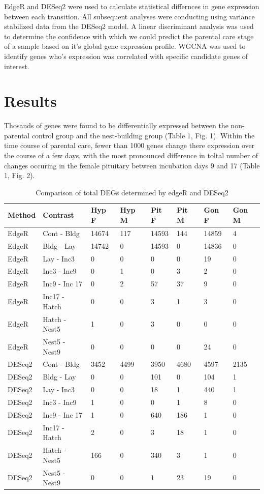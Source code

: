 \documentclass[10pt,letterpaper]{article}
\begin{document}
EdgeR and DESeq2 were used to calculate statistical differnces in gene
expression between each transition. All subsequent analyses were
conducting using variance stabilized data from the DESeq2 model. A
linear discriminant analysis was used to determine the confidence with
which we could predict the parental care stage of a sample based on it's
global gene expression profile. WGCNA was used to identify genes who's
expression was correlated with specific candidate genes of interest.

\hypertarget{results}{%
\section{Results}\label{results}}

Thosands of genes were found to be differentially expressed between the
non-parental control group and the nest-building group (Table 1, Fig.
1). Within the time course of parental care, fewer than 1000 genes
change there expression over the course of a few days, with the most
pronounced difference in toltal number of changes occuring in the female
pituitary between incubation days 9 and 17 (Table 1, Fig. 2).

\begin{table}[hb]
\begin{tabular}{llllllll}
\hline
\textbf{Method} & \textbf{Contrast} & \textbf{Hyp F} & \textbf{Hyp M} & \textbf{Pit F} & \textbf{Pit M} & \textbf{Gon F} & \textbf{Gon M} \\  \hline
EdgeR & Cont - Bldg & 14674 & 117 & 14593 & 144 & 14859 & 4 \\
EdgeR & Bldg - Lay & 14742 & 0 & 14593 & 0 & 14836 & 0 \\
EdgeR & Lay - Inc3 & 0 & 0 & 0 & 0 & 19 & 0 \\
EdgeR & Inc3 - Inc9 & 0 & 1 & 0 & 3 & 2 & 0 \\
EdgeR & Inc9 - Inc 17 & 0 & 2 & 57 & 37 & 9 & 0 \\
EdgeR & Inc17 - Hatch & 0 & 0 & 3 & 1 & 3 & 0 \\
EdgeR & Hatch - Nest5 & 1 & 0 & 3 & 0 & 0 & 0 \\
EdgeR & Nest5 - Nest9 & 0 & 0 & 0 & 0 & 24 & 0 \\  \hline
DESeq2 & Cont - Bldg & 3452 & 4499 & 3950 & 4680 & 4597 & 2135 \\
DESeq2 & Bldg - Lay & 0 & 0 & 101 & 0 & 104 & 1 \\
DESeq2 & Lay - Inc3 & 0 & 0 & 18 & 1 & 440 & 1 \\
DESeq2 & Inc3 - Inc9 & 1 & 0 & 0 & 1 & 8 & 0 \\
DESeq2 & Inc9 - Inc 17 & 1 & 0 & 640 & 186 & 1 & 0 \\
DESeq2 & Inc17 - Hatch & 2 & 0 & 3 & 18 & 1 & 0 \\
DESeq2 & Hatch - Nest5 & 166 & 0 & 340 & 3 & 1 & 0 \\
DESeq2 & Nest5 - Nest9 & 0 & 0 & 1 & 23 & 19 & 0 \\ \hline
\end{tabular}
\caption{Comparison of total DEGs determined by edgeR and DESeq2}
\label{tab:my-table}
\end{table}
\end{document}
